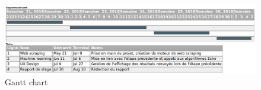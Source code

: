 \documentclass[12pt]{article}
\begin{document}
\begin{appendices}
\

\newpage
\begin{figure}[p]
	\centering
	\includegraphics[scale=0.3]{gantt.png}
	\caption{Gantt chart}
\end{figure}

\end{appendices}
\end{document}
